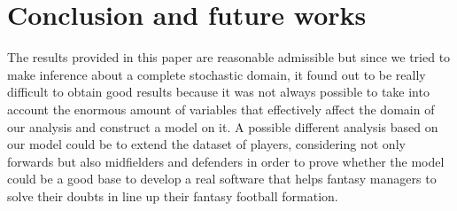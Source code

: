 \documentclass[a4paper,10pt]{report}
\begin{document}
\chapter{Conclusion and future works}\label{chap:chapter}
The results provided in this paper are reasonable admissible but since we tried to make inference about a complete stochastic domain, it found out to be really difficult to obtain good results because it was not always possible to take into account the enormous amount of variables that effectively affect the domain of our analysis and construct a model on it.
A possible different analysis based on our model could be to extend the dataset of players, considering not only forwards but also midfielders and defenders in order to prove whether the model could be a good base to develop a real software that helps fantasy managers to solve their doubts in line up their fantasy football formation.




{\let\clearpage\relax\par \printbibliography}
\end{document}
